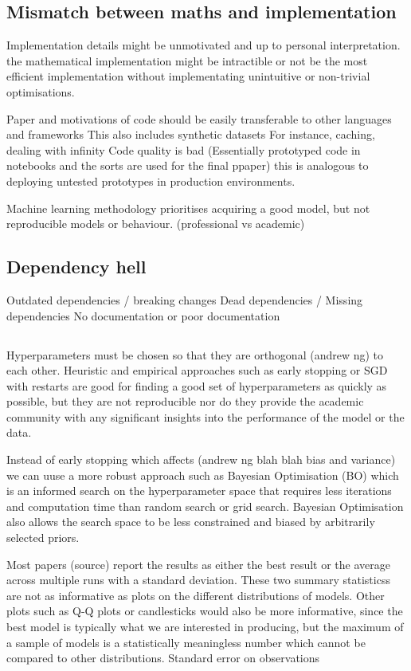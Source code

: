 \documentclass[a4paper,12pt]{article}
\begin{document}
\subsection{Mismatch between maths and implementation}
Implementation details might be unmotivated and up to personal interpretation.
the mathematical implementation might be intractible or not be the most efficient implementation
without implementating unintuitive or non-trivial optimisations.

Paper and motivations of code should be easily transferable to other languages and frameworks
This also includes synthetic datasets
For instance, caching, dealing with infinity
Code quality is bad (Essentially prototyped code in notebooks and the sorts are used for the final ppaper)
this is analogous to deploying untested prototypes in production environments.

Machine learning methodology prioritises acquiring a good model, but not reproducible models or behaviour. (professional vs academic)

\subsection{Dependency hell}
Outdated dependencies / breaking changes
Dead dependencies / Missing dependencies
No documentation or poor documentation




\subsection{}
Hyperparameters must be chosen so that they are orthogonal (andrew ng) to each other.
Heuristic and empirical approaches such as early stopping or SGD with restarts are good for 
finding a good set of hyperparameters as quickly as possible, but they are not
reproducible nor do they provide the academic community with 
any significant insights into the performance of the model or the data.

Instead of early stopping which affects (andrew ng blah blah bias and variance)
we can uuse a more robust approach such as Bayesian Optimisation (BO) which 
is an informed search on the hyperparameter space that requires
less iterations and computation time than random search or grid search.
Bayesian Optimisation also allows the search space to be less constrained and biased by
arbitrarily selected priors.

Most papers (source) report the results as either the best result or the average across
multiple runs with a standard deviation. These two summary statisticss are
not as informative as plots on the different distributions of models.
Other plots such as Q-Q plots or candlesticks would also be more informative, since
the best model is typically what we are interested in producing, but the maximum of a sample of models is a statistically meaningless number which cannot be compared to other distributions.
Standard error on observations
\end{document}
